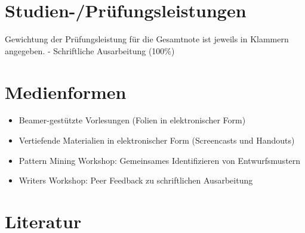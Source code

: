 \section*{Studien-/Prüfungsleistungen\label{/mi-2017/modulbeschreibungen-master/MA_SC_Soziotechnische_Entwurfsmuster}}\label{studien-pruxfcfungsleistungenpathlabelmi-2017modulbeschreibungen-mastermaux5fscux5fsoziotechnischeux5fentwurfsmuster}

Gewichtung der Prüfungsleistung für die Gesamtnote ist jeweils in
Klammern angegeben. - Schriftliche Ausarbeitung (100\%)

\section*{Medienformen\label{/mi-2017/modulbeschreibungen-master/MA_SC_Soziotechnische_Entwurfsmuster}}\label{medienformenpathlabelmi-2017modulbeschreibungen-mastermaux5fscux5fsoziotechnischeux5fentwurfsmuster}

\begin{itemize}
\tightlist
\item
  Beamer-gestützte Vorlesungen (Folien in elektronischer Form)
\item
  Vertiefende Materialien in elektronischer Form (Screencasts und
  Handouts)
\item
  Pattern Mining Workshop: Gemeinsames Identifizieren von
  Entwurfsmustern
\item
  Writers Workshop: Peer Feedback zu schriftlichen Ausarbeitung
\end{itemize}

\section*{Literatur\label{/mi-2017/modulbeschreibungen-master/MA_SC_Soziotechnische_Entwurfsmuster}}\label{literaturpathlabelmi-2017modulbeschreibungen-mastermaux5fscux5fsoziotechnischeux5fentwurfsmuster}

